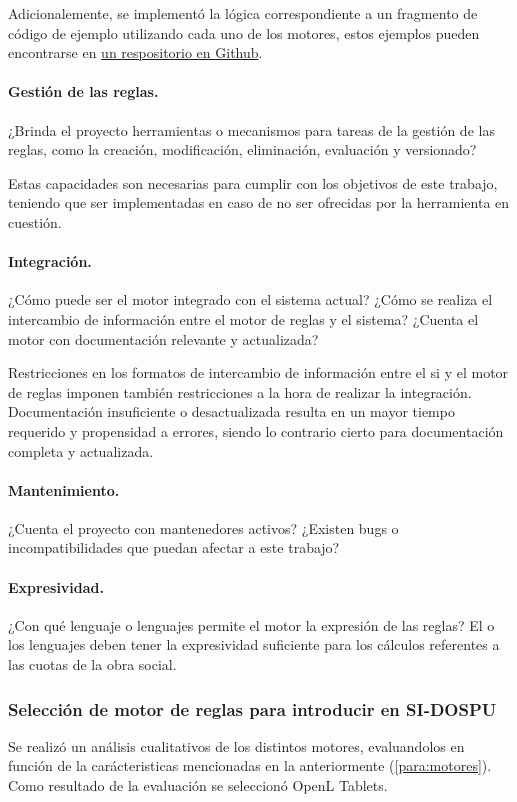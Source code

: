 Adicionalemente, se implementó la lógica correspondiente a un fragmento de código de ejemplo utilizando cada uno de los motores, estos ejemplos pueden encontrarse en \href{https://github.com/IvanB101/ejemplos-motores-reglas}{un respositorio en Github}.

\paragraph{Gestión de las reglas.}
¿Brinda el proyecto herramientas o mecanismos para tareas de la gestión de las reglas, como la creación, modificación, eliminación, evaluación y versionado?

Estas capacidades son necesarias para cumplir con los objetivos de este trabajo, teniendo que ser implementadas en caso de no ser ofrecidas por la herramienta en cuestión.

\paragraph{Integración.}
¿Cómo puede ser el motor integrado con el sistema actual? ¿Cómo se realiza el intercambio de información entre el motor de reglas y el sistema? ¿Cuenta el motor con documentación relevante y actualizada?

Restricciones en los formatos de intercambio de información entre el \acrshort{si} y el motor de reglas imponen también restricciones a la hora de realizar la integración.
Documentación insuficiente o desactualizada resulta en un mayor tiempo requerido y propensidad a errores, siendo lo contrario cierto para documentación completa y actualizada.

\paragraph{Mantenimiento.}
¿Cuenta el proyecto con mantenedores activos? ¿Existen bugs o incompatibilidades que puedan afectar a este trabajo?

\paragraph{Expresividad.}
¿Con qué lenguaje o lenguajes permite el motor la expresión de las reglas? El o los lenguajes deben tener la expresividad suficiente para los cálculos referentes a las cuotas de la obra social.

\subsubsection{Selección de motor de reglas para introducir en SI-DOSPU}
Se realizó un análisis cualitativos de los distintos motores, evaluandolos en función de la carácteristicas mencionadas en la anteriormente (\cref{para:motores}). Como resultado de la evaluación se seleccionó OpenL Tablets.

